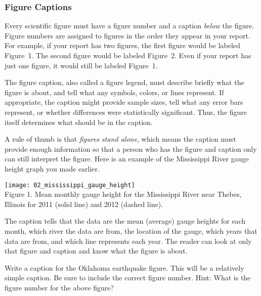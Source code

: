 \documentclass[12pt, hidelinks]{exam}
\begin{document}
\begin{questions}
\subsubsection*{Figure Captions}

Every scientific figure must have a figure number and a caption 
\emph{below} the figure. Figure numbers are assigned to figures 
in the order they appear in your report. For example, if your 
report has two figures, the first figure would be labeled Figure~1.
The second figure would be labeled Figure~2.
Even if your report has just one figure, it would still be labeled
Figure~1. 

The figure caption, also called a figure legend, must describe 
briefly what the figure is about, and tell what any symbols, 
colors, or lines represent. If appropriate, the caption might 
provide sample sizes, tell what any error bars represent, or 
whether differences were statistically significant. Thus, the 
figure itself determines what should be in the caption.

A rule of thumb is that \emph{figures stand alone,} which means 
the caption must provide enough information so that a person who 
has the figure and caption only can still interpret the figure. 
Here is an example of the Mississippi River gauge height graph you 
made earlier.

\vspace*{0.5\baselineskip}

\hfil%
\begin{minipage}{0.75\textwidth}
	\texttt{[image: 02\_mississippi\_gauge\_height]}\\
	Figure 1. Mean monthly gauge height for the Mississippi River near 
	Thebes, Illinois for 2011 (solid line) and 2012 (dashed line). 
\end{minipage}%
\hfil

\vspace{0.5\baselineskip}

The caption tells that the data are the mean (average) gauge heights for 
each month, which river the data are from, the location of the
gauge, which years that data are from, and which line represents each 
year. The reader can look at only that figure and caption and know what
the figure is about.


\newpage

\question
Write a caption for the Oklahoma earthquake figure. This will be 
a relatively simple caption. Be sure to include the correct figure 
number. Hint: What is the figure number for the above figure?


\end{questions}
\end{document}
